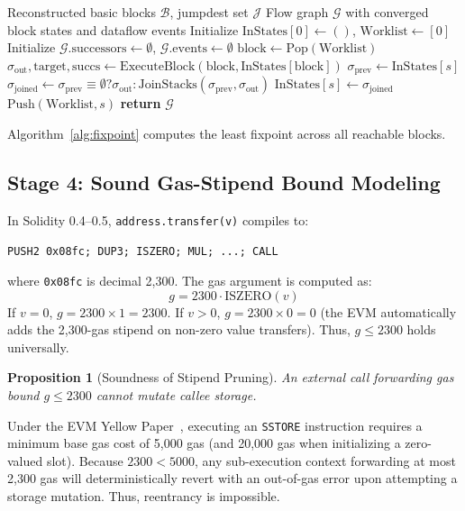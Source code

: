 \documentclass[conference]{IEEEtran}
\newtheorem{prop}{Proposition}
\newenvironment{proposition}[1][]{\begin{prop}[#1]\upshape}{\end{prop}}
\begin{document}
\begin{algorithm}[t]
\caption{Monotone Abstract Stack Dataflow Fixpoint}
\label{alg:fixpoint}
\begin{algorithmic}[1]
\REQUIRE Reconstructed basic blocks $\mathcal{B}$, jumpdest set $\mathcal{J}$
\ENSURE Flow graph $\mathcal{G}$ with converged block states and dataflow events
\STATE Initialize $\mathrm{InStates}[0] \leftarrow ()$, $\mathrm{Worklist} \leftarrow [0]$
\STATE Initialize $\mathcal{G}.\mathrm{successors} \leftarrow \emptyset$, $\mathcal{G}.\mathrm{events} \leftarrow \emptyset$
    \STATE $\mathrm{block} \leftarrow \mathrm{Pop}(\mathrm{Worklist})$
    \STATE $\sigma_{\mathrm{out}}, \mathrm{target}, \mathrm{succs} \leftarrow \mathrm{ExecuteBlock}(\mathrm{block}, \mathrm{InStates}[\mathrm{block}])$
        \STATE $\sigma_{\mathrm{prev}} \leftarrow \mathrm{InStates}[s]$
        \STATE $\sigma_{\mathrm{joined}} \leftarrow \sigma_{\mathrm{prev}} \equiv \emptyset ? \sigma_{\mathrm{out}} : \mathrm{JoinStacks}(\sigma_{\mathrm{prev}}, \sigma_{\mathrm{out}})$
            \STATE $\mathrm{InStates}[s] \leftarrow \sigma_{\mathrm{joined}}$
            \STATE $\mathrm{Push}(\mathrm{Worklist}, s)$
        \ENDIF
    \ENDFOR
\ENDWHILE
\STATE \textbf{return} $\mathcal{G}$
\end{algorithmic}
\end{algorithm}

Algorithm~\ref{alg:fixpoint} computes the least fixpoint across all reachable blocks. 

\subsection{Stage 4: Sound Gas-Stipend Bound Modeling}
In Solidity 0.4--0.5, \texttt{address.transfer(v)} compiles to:
\begin{center}
\small
\texttt{PUSH2 0x08fc; DUP3; ISZERO; MUL; ...; CALL}
\end{center}
where \texttt{0x08fc} is decimal 2,300. The gas argument is computed as:
\begin{equation}
g = 2300 \cdot \mathrm{ISZERO}(v)
\end{equation}
If $v = 0$, $g = 2300 \times 1 = 2300$. If $v > 0$, $g = 2300 \times 0 = 0$ (the EVM automatically adds the 2,300-gas stipend on non-zero value transfers). Thus, $g \le 2300$ holds universally.

\begin{proposition}[Soundness of Stipend Pruning]
An external call forwarding gas bound $g \le 2300$ cannot mutate callee storage.
\end{proposition}
\begin{IEEEproof}
Under the EVM Yellow Paper~\cite{wood2014ethereum}, executing an \texttt{SSTORE} instruction requires a minimum base gas cost of 5,000 gas (and 20,000 gas when initializing a zero-valued slot). Because $2300 < 5000$, any sub-execution context forwarding at most 2,300 gas will deterministically revert with an out-of-gas error upon attempting a storage mutation. Thus, reentrancy is impossible.
\end{IEEEproof}
\end{document}
